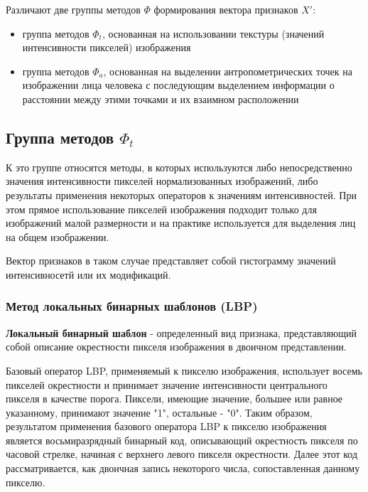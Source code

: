 \documentclass[12pt,a4paper]{article}
\begin{document}
Различают две группы методов $\Phi$ формирования вектора признаков $X':$
\begin{itemize}
    \item группа методов $\Phi_t$, основанная на использовании текстуры (значений интенсивности пикселей) изображения
    \item группа методов $\Phi_a$, основанная на выделении антропометрических точек на изображении лица человека с последующим выделением информации о расстоянии между этими точками и их взаимном расположении
\end{itemize}

\subsection{Группа методов $\Phi_t$}
К это группе относятся методы, в которых используются либо непосредственно значения интенсивности пикселей нормализованных изображений, либо результаты применения некоторых операторов к значениям интенсивностей. При этом прямое использование пикселей изображения подходит только для изображений малой размерности и на практике используется для выделения лиц на общем изображении.

Вектор признаков в таком случае представляет собой гистограмму значений интенсивносетй или их модификаций. 

\subsubsection{Метод локальных бинарных шаблонов (LBP)}
\textbf{Локальный бинарный шаблон} - определенный вид признака, представляющий собой описание окрестности пикселя изображения в двоичном представлении.

Базовый оператор LBP, применяемый к пикселю изображения, использует восемь пикселей окрестности и принимает значение интенсивности центрального пикселя в качестве порога. Пиксели, имеющие значение, большее или равное указанному, принимают значение "1", остальные - "0". Таким образом, результатом применения базового оператора LBP к пикселю изображения является восьмиразрядный бинарный код, описывающий окрестность пикселя по часовой стрелке, начиная с верхнего левого пикселя окрестности. Далее этот код рассматривается, как двоичная запись некоторого числа, сопоставленная данному пикселю.
\end{document}
